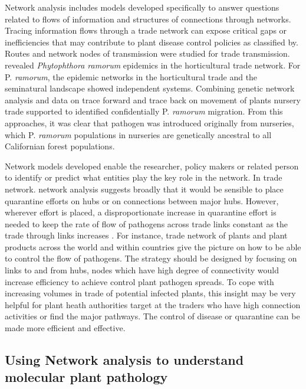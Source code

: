 Network analysis includes models developed specifically to answer questions related to flows of information and structures of connections through networks. Tracing information flows through a trade network can expose critical gaps or inefficiencies that may contribute to plant disease control policies as classified by. Routes and network nodes of transmission were studied for trade transmission.  revealed \textit{Phytophthora ramorum} epidemics in the horticultural trade network. For P. \textit{ramorum}, the epidemic networks in the horticultural trade and the seminatural landscape showed independent systems. Combining genetic network analysis and data on trace forward and trace back on movement of plants nursery trade supported to identified confidentially P. \textit{ramorum} migration. From this approaches, it was clear that pathogen was introduced originally from nurseries, which P. \textit{ramorum} populations in nurseries are genetically ancestral to all Californian forest populations.


Network models developed enable the researcher, policy makers or related person to identify or predict what entities play the key role in the network. In trade network. network analysis suggests broadly that it would be sensible to place quarantine efforts on hubs or on connections between major hubs. However, wherever effort is placed, a disproportionate increase in quarantine effort is needed to keep the rate of flow of pathogens across trade links constant as the trade through links increases . For instance, trade network of plants and plant products across the world and within countries give the picture on how to be able to control the flow of pathogens. The strategy should be designed by focusing on links to and from hubs, nodes which have high degree of connectivity would increase efficiency to achieve control plant pathogen spreads.  To cope with increasing volumes in trade of potential infected plants, this insight may be very helpful for plant heath authorities target at the traders who have high connection activities or find the major pathways. The control of disease or quarantine can be made more efficient and effective.

\subsection*{Using Network analysis to understand molecular plant pathology}


